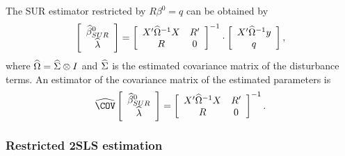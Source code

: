 The SUR estimator restricted by $R \beta^0 = q$ can be obtained by
\begin{equation}
   \left[ \begin{array}{c}
      \widehat{\beta}^0_{SUR} \\ \widehat{\lambda}
   \end{array} \right]
   =
   \left[ \begin{array}{cc}
      X' \widehat{\Omega}^{-1} X & R' \\
      R & 0
   \end{array} \right]^{-1}
   \cdot
   \left[ \begin{array}{c}
      X' \widehat{\Omega}^{-1} y \\ q
   \end{array} \right] ,
\end{equation}
where $\widehat{\Omega} = \widehat{\Sigma} \otimes I$ and
$\widehat{\Sigma}$ is the estimated covariance matrix of the disturbance terms.
An estimator of the covariance matrix of the estimated parameters is
\begin{equation}
   \COVHat
   \left[ \begin{array}{c}
      \widehat{\beta}^0_{SUR} \\ \widehat{\lambda}
   \end{array} \right] 
   = 
   \left[ \begin{array}{cc}
      X' \OHat^{-1} X & R' \\
      R & 0
   \end{array} \right]^{-1} .
\end{equation}

\subsubsection{Restricted 2SLS estimation}

